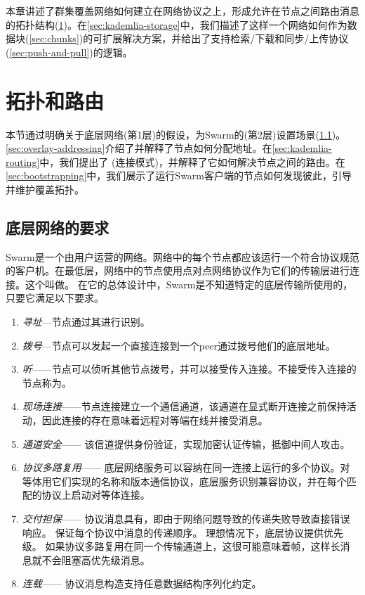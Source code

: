 本章讲述了群集覆盖网络如何建立在网络协议之上，形成允许在节点之间路由消息的拓扑结构(\ref{sec:topology-routing})。在\ref{sec:kademlia-storage}中，我们描述了这样一个网络如何作为数据块(\ref{sec:chunks})的可扩展解决方案，并给出了支持检索/下载和同步/上传协议(\ref{sec:push-and-pull})的逻辑。

\section{拓扑和路由\statusgreen}\label{sec:topology-routing}

本节通过明确关于底层网络(第1层)的假设，为Swarm的(第2层)设置场景(\ref{sec:underlay-transport})。\ref{sec:overlay-addressing}介绍了并解释了节点如何分配地址。在\ref{sec:kademlia-routing}中，我们提出了 (连接模式)，并解释了它如何解决节点之间的路由。在\ref{sec:bootstrapping}中，我们展示了运行Swarm客户端的节点如何发现彼此，引导并维护覆盖拓扑。

\subsection{底层网络的要求\statusyellow}\label{sec:underlay-transport} 

\yellow{}

Swarm是一个由用户运营的网络。网络中的每个节点都应该运行一个符合协议规范的客户机。在最低层，网络中的节点使用点对点网络协议作为它们的传输层进行连接。这个叫做。
在它的总体设计中，Swarm是不知道特定的底层传输所使用的，只要它满足以下要求。

\begin{enumerate}
    \item \emph{寻址}—节点通过其进行识别。
    \item \emph{拨号}—节点可以发起一个直接连接到一个peer通过拨号他们的底层地址。
    \item \emph{听}——节点可以侦听其他节点拨号，并可以接受传入连接。不接受传入连接的节点称为。
    \item \emph{现场连接}——节点连接建立一个通信通道，该通道在显式断开连接之前保持活动，因此连接的存在意味着远程对等端在线并接受消息。
    \item \emph{通道安全}——
该信道提供身份验证，实现加密认证传输，抵御中间人攻击。
    \item \emph{协议多路复用}——
底层网络服务可以容纳在同一连接上运行的多个协议。对等体用它们实现的名称和版本通信协议，底层服务识别兼容协议，并在每个匹配的协议上启动对等体连接。 
    \item \emph{交付担保}——
协议消息具有，即由于网络问题导致的传递失败导致直接错误响应。
保证每个协议中消息的传递顺序。
理想情况下，底层协议提供优先级。
如果协议多路复用在同一个传输通道上，这很可能意味着帧，这样长消息就不会阻塞高优先级消息。
    \item \emph{连载}——
协议消息构造支持任意数据结构序列化约定。
    
\end{enumerate}

